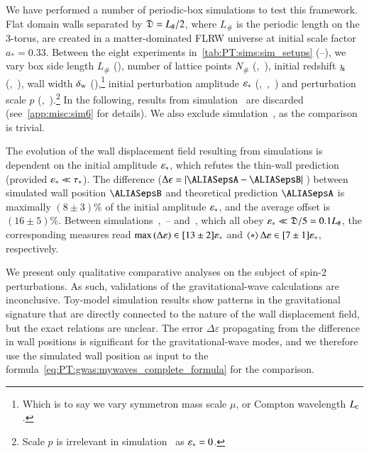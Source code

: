 We have performed a number of periodic-box simulations to test this framework. Flat domain walls separated by $\mathfrak{D}=L_\#/2$, where $L_\#$ is the periodic length on the 3-torus, are created in a matter-dominated FLRW universe at initial  scale factor $a_\ast=0.33$. Between the eight experiments in~\cref{tab:PT:sims:sim_setups} (--), we vary 
box side length $L_\#$ (), 
number of lattice points $N_\#$ (,~), 
initial redshift $\mathfrak{z}_\mathrm{i}$ (,~), 
wall width $\delta_\mathrm{w}$ (),\footnote{Which is to say we vary symmetron mass scale $\mu$, or Compton wavelength $L_{\text{\tiny{C}}}$.} %
initial perturbation amplitude $\varepsilon_\ast$ (,~,~) and 
perturbation scale $p$ (,~).\footnote{Scale $p$ is irrelevant in simulation~ as $\varepsilon_\ast=0$.} In the following, results from simulation~ are discarded (see~\cref{app:misc:sim6} for details). We also exclude simulation~, as the comparison is trivial.


The evolution of the wall displacement field resulting from simulations is dependent on the initial amplitude $\varepsilon_\ast$, 
which refutes the thin-wall prediction 
(provided $\varepsilon_\ast \ll \tau_\ast$). 
The difference ($\Delta \epsilon=\abs*{\epsA-\epsB}$) between simulated wall position $\epsB$ and theoretical prediction $\epsA$ is maximally $(8\pm 3)\%$ of the initial amplitude $\varepsilon_\ast$, and the average offset is
$(16\pm 5)\%$. Between simulations~,~-- and~, which all obey $\varepsilon_\ast\ll \mathfrak{D}/5=0.1L_\#$, the corresponding measures read $\max{(\Delta\varepsilon)} \in [13\pm 2]\varepsilon_\ast$ and $\left\langle{*}\right\rangle{\Delta \varepsilon}\in [7\pm 1]\varepsilon_\ast$, respectively. 


We present only qualitative comparative analyses on the subject of spin-2 perturbations. 
As such, validations of the gravitational-wave calculations are inconclusive. Toy-model simulation results show patterns in the gravitational signature that are directly connected to the nature of the wall displacement field, but the exact relations are unclear. %
The error $\Delta \varepsilon$ propagating from the difference in wall positions %
is significant for the gravitational-wave modes, and we therefore use the simulated wall position as input to the formula~\cref{eq:PT:gwas:mywaves_complete_formula} for the comparison.



